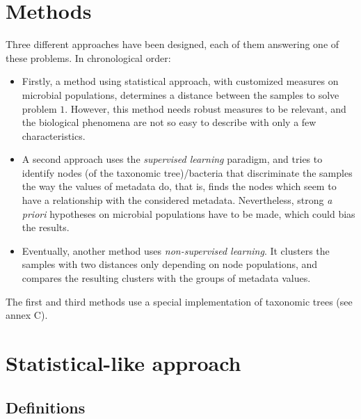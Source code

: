 \documentclass{report}
\begin{document}
\newpage

\chapter*{Methods}

Three different approaches have been designed, each of them answering one of these problems. In chronological order:
\begin{itemize}
\item Firstly, a method using statistical approach, with customized measures on microbial populations, determines a distance between the samples to solve problem $1$. However, this method needs robust measures to be relevant, and the biological phenomena are not so easy to describe with only a few characteristics.
\item A second approach uses the \emph{supervised learning} paradigm, and tries to identify nodes (of the taxonomic tree)/bacteria that discriminate the samples the way the values of metadata do, that is, finds the nodes which seem to have a relationship with the considered metadata. Nevertheless, strong \emph{a priori} hypotheses on microbial populations have to be made, which could bias the results.
\item Eventually, another method uses \emph{non-supervised learning}. It clusters the samples with two distances only depending on node populations, and compares the resulting clusters with the groups of metadata values.
\end{itemize}
The first and third methods use a special implementation of taxonomic trees (see annex \textsc{C}).

\chapter{Statistical-like approach}

\section{Definitions}
\end{document}
